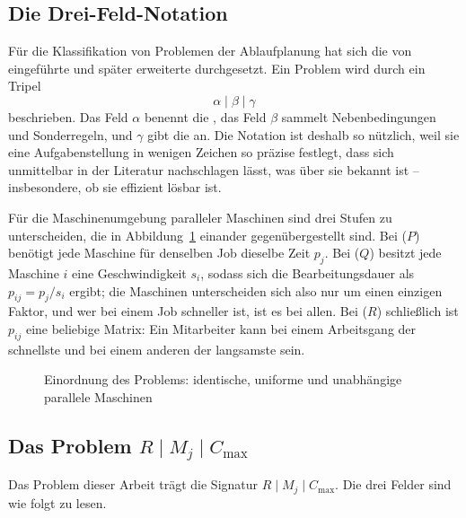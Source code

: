 \subsection{Die Drei-Feld-Notation}

Für die Klassifikation von Problemen der Ablaufplanung hat sich die von
\textcite{graham1969bounds} eingeführte und später erweiterte
 durchgesetzt. Ein Problem wird durch ein Tripel
\begin{equation}
  \alpha \mid \beta \mid \gamma
\end{equation}
beschrieben. Das Feld $\alpha$ benennt die , das Feld
$\beta$ sammelt Nebenbedingungen und Sonderregeln, und $\gamma$ gibt die
 an. Die Notation ist deshalb so nützlich, weil sie eine
Aufgabenstellung in wenigen Zeichen so präzise festlegt, dass sich unmittelbar
in der Literatur nachschlagen lässt, was über sie bekannt ist -- insbesondere,
ob sie effizient lösbar ist.

Für die Maschinenumgebung paralleler Maschinen sind drei Stufen zu
unterscheiden, die in Abbildung~\ref{abb:maschinenmodell} einander
gegenübergestellt sind. Bei  ($P$)
benötigt jede Maschine für denselben Job dieselbe Zeit $p_j$. Bei
 ($Q$) besitzt jede Maschine $i$ eine
Geschwindigkeit $s_i$, sodass sich die Bearbeitungsdauer als $p_{ij} = p_j /
s_i$ ergibt; die Maschinen unterscheiden sich also nur um einen einzigen Faktor,
und wer bei einem Job schneller ist, ist es bei allen. Bei  ($R$) schließlich ist $p_{ij}$ eine beliebige Matrix: Ein
Mitarbeiter kann bei einem Arbeitsgang der schnellste und bei einem anderen der
langsamste sein.

\begin{figure}[tb]
  \centering
  
  \caption[Maschinenmodelle im Vergleich]{Einordnung des Problems: identische, uniforme und unabhängige parallele Maschinen}
  \label{abb:maschinenmodell}
\end{figure}

\subsection{Das Problem \texorpdfstring{$R\mid M_j\mid C_{\max}$}{R|Mj|Cmax}}

Das Problem dieser Arbeit trägt die Signatur $R \mid M_j \mid C_{\max}$. Die
drei Felder sind wie folgt zu lesen.

